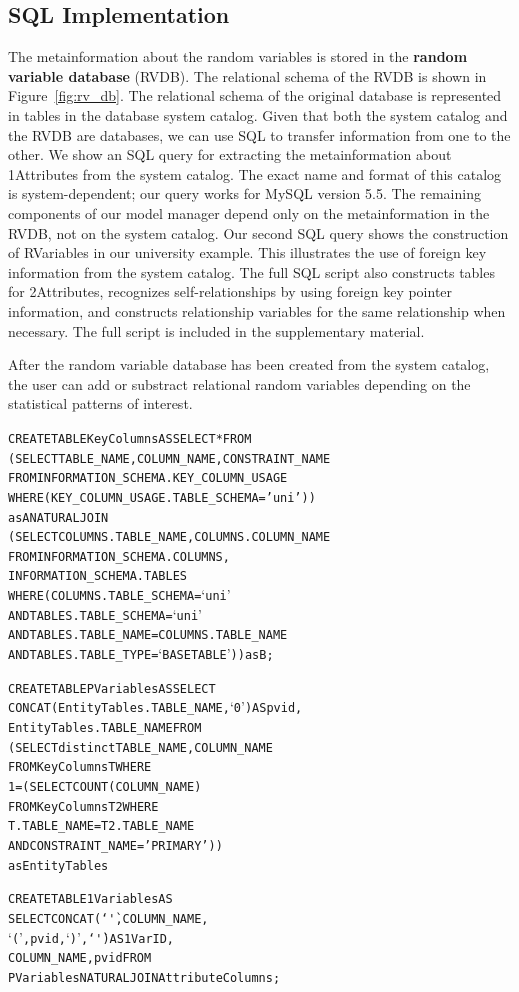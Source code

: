 \documentclass{acm_proc_article-sp}
\begin{document}
\subsection{SQL Implementation}

The metainformation about the random variables is stored in the \textbf{random variable database} (RVDB). The relational schema of the RVDB is shown in Figure~\ref{fig:rv_db}. %
The relational schema of the original database is represented in tables in the database system catalog. Given that both the system catalog and the RVDB are databases, we can use SQL to transfer information from one to the other. %
We show an SQL query for extracting the metainformation about 1Attributes from the system catalog. The exact name and format of this catalog is system-dependent; our query works for MySQL version 5.5. The remaining components of our model manager depend only on the metainformation in the RVDB, not on the system catalog.
Our second SQL query shows the construction of RVariables in our university example. This illustrates the use of foreign key information from the system catalog. The full SQL script also constructs tables for 2Attributes, recognizes self-relationships by using foreign key pointer information, and constructs relationship variables for the same relationship when necessary. The full script is included in the supplementary material. 

After the random variable database has been created from the system catalog, the user  can add or substract relational random variables depending on the statistical patterns of interest.
\begin{alltt}
CREATE TABLE  KeyColumns AS SELECT * FROM
(SELECT TABLE_NAME, COLUMN_NAME, CONSTRAINT_NAME 
FROM  INFORMATION_SCHEMA.KEY_COLUMN_USAGE
WHERE  (KEY_COLUMN_USAGE.TABLE_SCHEMA = 'uni'))
 as A NATURAL JOIN 
(SELECT COLUMNS.TABLE_NAME, COLUMNS.COLUMN_NAME     
FROM   INFORMATION_SCHEMA.COLUMNS,    
INFORMATION_SCHEMA.TABLES
WHERE  (COLUMNS.TABLE_SCHEMA = `uni'        
AND TABLES.TABLE_SCHEMA = `uni'
AND TABLES.TABLE_NAME = COLUMNS.TABLE_NAME 
AND TABLES.TABLE_TYPE = `BASE TABLE') ) as B;

CREATE TABLE PVariables AS  SELECT 
CONCAT(EntityTables.TABLE_NAME, `0') AS pvid,
EntityTables.TABLE_NAME FROM
(SELECT distinct TABLE_NAME, COLUMN_NAME 
FROM   KeyColumns T WHERE
1 = (SELECT  COUNT(COLUMN_NAME)   
FROM   KeyColumns T2  WHERE     
T.TABLE_NAME = T2.TABLE_NAME
AND CONSTRAINT_NAME = 'PRIMARY')) 
as EntityTables 

CREATE TABLE 1Variables AS
SELECT CONCAT(`\`', COLUMN_NAME,
 `(', pvid, `)', `\`') AS 1VarID,
COLUMN_NAME,   pvid  FROM    
PVariables   NATURAL JOIN  AttributeColumns;

\end{alltt}
\end{document}
